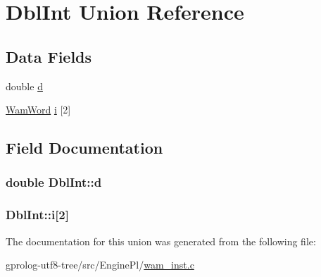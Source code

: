 \hypertarget{unionDblInt}{}\section{Dbl\+Int Union Reference}
\label{unionDblInt}
\subsection*{Data Fields}
\begin{DoxyCompactItemize}
\item 
double \hyperlink{unionDblInt_a23665c821d8bb2ce3af4f5783fa5ed7c}{d}
\item 
\hyperlink{LINUX__SIGSEGV_8c_a10ea8be8823feb38875b8a9326cbb424}{Wam\+Word} \hyperlink{unionDblInt_ad0ddb3bdd3543a38a19752bc2ac77885}{i} \mbox{[}2\mbox{]}
\end{DoxyCompactItemize}


\subsection{Field Documentation}
\subsubsection[{\texorpdfstring{d}{d}}]{\setlength{\rightskip}{0pt plus 5cm}double Dbl\+Int\+::d}\hypertarget{unionDblInt_a23665c821d8bb2ce3af4f5783fa5ed7c}{}\label{unionDblInt_a23665c821d8bb2ce3af4f5783fa5ed7c}
\subsubsection[{\texorpdfstring{i}{i}}]{ Dbl\+Int\+::i\mbox{[}2\mbox{]}}\hypertarget{unionDblInt_ad0ddb3bdd3543a38a19752bc2ac77885}{}\label{unionDblInt_ad0ddb3bdd3543a38a19752bc2ac77885}


The documentation for this union was generated from the following file\+:\begin{DoxyCompactItemize}
\item 
gprolog-\/utf8-\/tree/src/\+Engine\+Pl/\hyperlink{wam__inst_8c}{wam\+\_\+inst.\+c}\end{DoxyCompactItemize}
